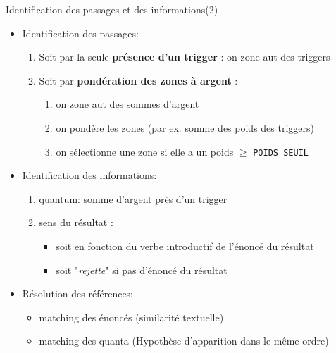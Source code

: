 \documentclass[newPxFont,pagenumber]{beamer}
\begin{document}
\begin{frame}{Identification des passages et des informations(2)}
\begin{itemize}
\item Identification des passages: 
\begin{enumerate}
\item Soit par la seule \textbf{présence d'un trigger} : on zone aut des triggers 
\item Soit par \textbf{pondération des zones à argent}  : 
\begin{enumerate}
\item on zone aut des sommes d'argent
\item on pondère les zones (par ex. somme des poids des triggers)
\item on sélectionne une zone si elle a un poids $\geq$ \texttt{POIDS SEUIL}
\end{enumerate}
\end{enumerate}
\item Identification des informations:
\begin{enumerate}
\item quantum: somme d'argent près d'un trigger
\item sens du résultat : 
\begin{itemize}
\item soit en fonction du verbe introductif de l'énoncé du résultat
\item soit "\textit{rejette}" si pas d'énoncé du résultat
\end{itemize}
\end{enumerate}
\item Résolution des références:
\begin{itemize}
\item matching des énoncés (similarité textuelle)
\item matching des quanta (Hypothèse d'apparition dans le même ordre)
\end{itemize}
\end{itemize}
\end{frame}
\end{document}
